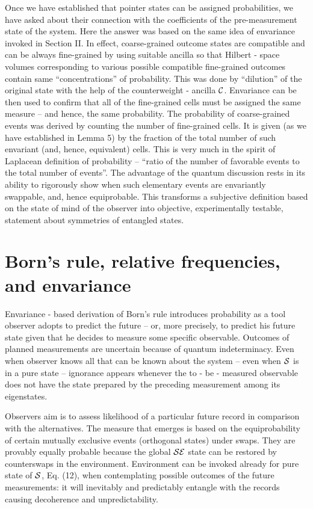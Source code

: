 \documentclass[aps,twocolumn,pra,epsfig]{revtex4}
\begin{document}
Once we have established that pointer states can be assigned probabilities, we
have asked about their connection with the coefficients of the pre-measurement
state of the system. Here the answer was based on the same idea of envariance
invoked in Section II. In effect, coarse-grained outcome states are compatible
and can be always fine-grained by using suitable ancilla so that 
Hilbert - space volumes corresponding to various possible compatible 
fine-grained outcomes
contain same ``concentrations'' of probability. This was done by ``dilution''
of the original state with the help of the counterweight - ancilla ${\cal C}$. Envariance
can be then used to confirm that all of the fine-grained cells must be assigned
the same measure -- and hence, the same probability. The probability of
coarse-grained events was derived by counting the number of fine-grained cells.
It is given (as we have established in Lemma 5) by the fraction of the total
number of such envariant (and, hence, equivalent) cells. This is very much in
the spirit of Laplacean definition of probability -- ``ratio of the number of
favorable events to the total number of events''. The advantage of the quantum
discussion rests in its ability to rigorously show when such elementary events
are envariantly swappable, and, hence equiprobable. This transforms a
subjective definition based on the state of mind of the observer into objective, 
experimentally testable, statement about symmetries of entangled states.


\section{Born's rule, relative frequencies, and envariance}

Envariance - based derivation of Born's rule introduces probability as a tool
observer adopts to predict the future -- or, more precisely, to predict his future state
given that he decides to measure some specific observable. Outcomes of planned
measurements are uncertain because of quantum indeterminacy. Even when observer
knows all that can be known about the system -- even when ${\cal S}$ is in
a pure state -- ignorance appears whenever the to - be - measured observable
does not have the state prepared by the preceding measurement among
its eigenstates.

Observers aim is to assess likelihood of a particular future record in
comparison with the alternatives. The measure that emerges is based on
the equiprobability of certain mutually exclusive events (orthogonal states) under
swaps. They are provably equally probable because the global ${\cal SE}$ 
state can be restored by counterswaps in the environment. Environment 
can be invoked already for pure state of ${\cal S}$, Eq. (12), when 
contemplating possible outcomes of the future measurements: it will 
inevitably and predictably entangle with the records causing decoherence 
and unpredictability.
\end{document}
